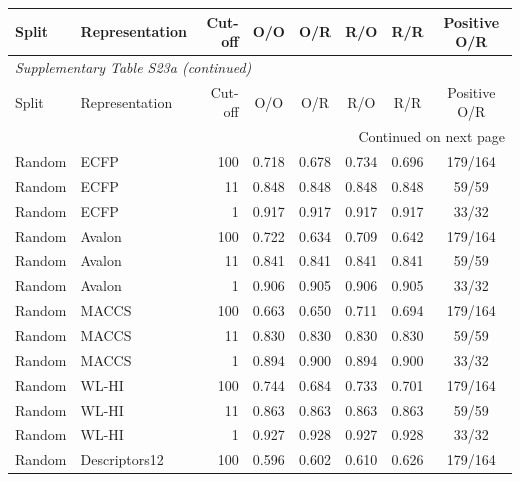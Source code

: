 \begin{longtable}{llrccccc}

\toprule Split & Representation & Cut-off & O/O & O/R & R/O & R/R & Positive O/R \\ \midrule\endfirsthead

\multicolumn{8}{l}{\textit{Supplementary Table S23a (continued)}} \\

\toprule Split & Representation & Cut-off & O/O & O/R & R/O & R/R & Positive O/R \\ \midrule\endhead

\midrule\multicolumn{8}{r}{Continued on next page}\\\endfoot\bottomrule\endlastfoot

Random & ECFP & 100 & 0.718 & 0.678 & 0.734 & 0.696 & 179/164 \\

Random & ECFP & 11 & 0.848 & 0.848 & 0.848 & 0.848 & 59/59 \\

Random & ECFP & 1 & 0.917 & 0.917 & 0.917 & 0.917 & 33/32 \\

Random & Avalon & 100 & 0.722 & 0.634 & 0.709 & 0.642 & 179/164 \\

Random & Avalon & 11 & 0.841 & 0.841 & 0.841 & 0.841 & 59/59 \\

Random & Avalon & 1 & 0.906 & 0.905 & 0.906 & 0.905 & 33/32 \\

Random & MACCS & 100 & 0.663 & 0.650 & 0.711 & 0.694 & 179/164 \\

Random & MACCS & 11 & 0.830 & 0.830 & 0.830 & 0.830 & 59/59 \\

Random & MACCS & 1 & 0.894 & 0.900 & 0.894 & 0.900 & 33/32 \\

Random & WL-HI & 100 & 0.744 & 0.684 & 0.733 & 0.701 & 179/164 \\

Random & WL-HI & 11 & 0.863 & 0.863 & 0.863 & 0.863 & 59/59 \\

Random & WL-HI & 1 & 0.927 & 0.928 & 0.927 & 0.928 & 33/32 \\

Random & Descriptors12 & 100 & 0.596 & 0.602 & 0.610 & 0.626 & 179/164 \\


\end{longtable}
